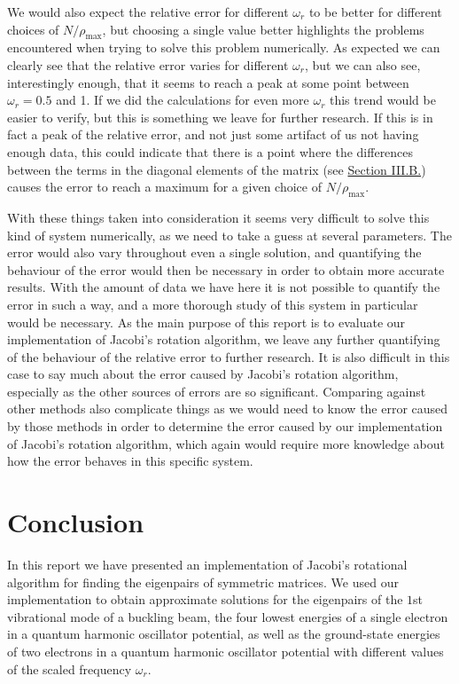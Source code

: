 \documentclass[reprint,english,notitlepage]{revtex4-1}  %
\begin{document}
We would also expect the relative error for different $\omega_r$ to be better for different choices of $N/\rho_\text{max}$, but choosing a single value better highlights the problems encountered when trying to solve this problem numerically. As expected we can clearly see that the relative error varies for different $\omega_r$, but we can also see, interestingly enough, that it seems to reach a peak at some point between $\omega_r = 0.5$ and 1. If we did the calculations for even more $\omega_r$ this trend would be easier to verify, but this is something we leave for further research. If this is in fact a peak of the relative error, and not just some artifact of us not having enough data, this could indicate that there is a point where the differences between the terms in the diagonal elements of the matrix (see \hyperref[sec:III:b]{Section III.B.}) causes the error to reach a maximum for a given choice of $N/\rho_\text{max}$.

With these things taken into consideration it seems very difficult to solve this kind of system numerically, as we need to take a guess at several parameters. The error would also vary throughout even a single solution, and quantifying the behaviour of the error would then be necessary in order to obtain more accurate results. With the amount of data we have here it is not possible to quantify the error in such a way, and a more thorough study of this system in particular would be necessary. As the main purpose of this report is to evaluate our implementation of Jacobi's rotation algorithm, we leave any further quantifying of the behaviour of the relative error to further research. It is also difficult in this case to say much about the error caused by Jacobi's rotation algorithm, especially as the other sources of errors are so significant. Comparing against other methods also complicate things as we would need to know the error caused by those methods in order to determine the error caused by our implementation of Jacobi's rotation algorithm, which again would require more knowledge about how the error behaves in this specific system. \newline \newline

\newpage
\section{Conclusion} \label{sec:VI}
In this report we have presented an implementation of Jacobi's rotational algorithm for finding the eigenpairs of symmetric matrices. We used our implementation to obtain approximate solutions for the eigenpairs of the \(1\)st vibrational mode of a buckling beam, the four lowest energies of a single electron in a quantum harmonic oscillator potential, as well as the ground-state energies of two electrons in a quantum harmonic oscillator potential with different values of the scaled frequency \(\omega_{r}\).
\end{document}
